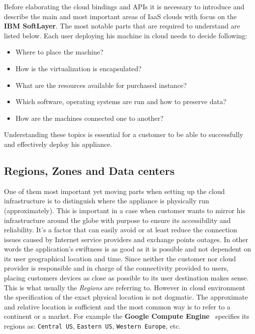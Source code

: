 Before elaborating the cloud bindings and APIs it is necessary to introduce and describe the main and most important areas of IaaS clouds with focus on the \textbf{IBM SoftLayer}. The most notable parts that are required to understand are listed below. Each user deploying his machine in cloud needs to decide following:

\begin{itemize}
	\item Where to place the machine?
	\item How is the virtualization is encapsulated?
	\item What are the resources available for purchased instance?
	\item Which software, operating systems are run and how to preserve data?
	\item How are the machines connected one to another?
\end{itemize}

Understanding these topics is essential for a customer to be able to successfully and effectively deploy his appliance.

\subsection{Regions, Zones and Data centers}
\label{sub:Regions, Zones and Data centers}

One of them most important yet moving parts when setting up the cloud infrastructure is to distinguish where the appliance is physically run (approximately). This is important in a case when customer wants to mirror his infrastructure around the globe with purpose to ensure its accessibility and reliability. It's a factor that can easily avoid or at least reduce the connection issues caused by Internet service providers and exchange points outages. In other words the application's swiftness is as good as it is possible and not dependent on its user geographical location and time. Since neither the customer nor cloud provider is responsible and in charge of the connectivity provided to users, placing customers devices as close as possible to its user destination makes sense. This is what usually the \emph{Regions} are referring to. However in cloud environment the specification of the exact physical location is not dogmatic. The approximate and relative location is sufficient and the most common way is to refer to a continent or a market. For example the \textbf{Google Compute Engine}~\cite{gce} specifies its regions as: \texttt{Central US}, \texttt{Eastern US}, \texttt{Western Europe}, etc.

